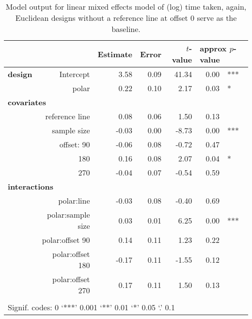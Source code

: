 \begin{table}[ht]
\begin{center}
\resizebox{\linewidth}{!} {
\begin{tabular}{lrrrrrl}
  \hline
& & Estimate & Error & $t$-value & \multicolumn{2}{l}{approx $p$-value} \\ 
  \hline
\bf design & Intercept & 3.58 & 0.09 & 41.34 & 0.00 & ***\\ 
&  polar & 0.22 & 0.10 & 2.17 & 0.03 & * \\ [2pt]
\multicolumn{2}{l}{\bf covariates}\\
&reference line & 0.08 & 0.06 & 1.50 & 0.13 \\ [1pt]
 & sample size & -0.03 & 0.00 & -8.73 & 0.00 & ***\\ [1pt]
&  offset: 90 & -0.06 & 0.08 & -0.72 & 0.47 \\ 
& 180 & 0.16 & 0.08 & 2.07 & 0.04 & *\\ 
&  270 & -0.04 & 0.07 & -0.54 & 0.59 \\ [2pt]
\multicolumn{2}{l}{\bf interactions}\\
&  polar:line & -0.03 & 0.08 & -0.40 & 0.69 \\ [1pt]
&    polar:sample size & 0.03 & 0.01 & 6.25 & 0.00 & ***\\ [1pt]
&    polar:offset 90 & 0.14 & 0.11 & 1.23 & 0.22 \\ 
&    polar:offset 180 & -0.17 & 0.11 & -1.55 & 0.12 \\ 
&    polar:offset 270 & 0.17 & 0.11 & 1.50 & 0.13 \\ 
   \hline
\\[-5pt]
   \multicolumn{5}{l}{Signif. codes:  0 `***' 0.001 `**' 0.01 `*' 0.05 `.' 0.1}
\end{tabular}}
\end{center}
\caption{\label{tbl:time} Model output for linear mixed effects model of (log) time taken, again, Euclidean designs without a reference line at offset 0 serve as the baseline. }
\end{table}



